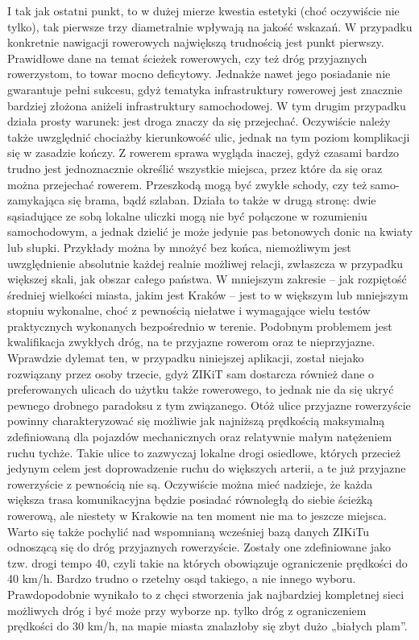 I tak jak ostatni punkt, to w dużej mierze kwestia estetyki (choć oczywiście nie tylko), tak pierwsze trzy diametralnie wpływają na jakość wskazań. W przypadku konkretnie nawigacji rowerowych największą trudnością jest punkt pierwszy. Prawidłowe dane na temat ścieżek rowerowych, czy też dróg przyjaznych rowerzystom, to towar mocno deficytowy. Jednakże nawet jego posiadanie nie gwarantuje pełni sukcesu, gdyż tematyka infrastruktury rowerowej jest znacznie bardziej złożona aniżeli infrastruktury samochodowej. W tym drugim przypadku działa prosty warunek: jest droga znaczy da się przejechać. Oczywiście należy także uwzględnić chociażby kierunkowość ulic, jednak na tym poziom komplikacji się w zasadzie kończy. Z rowerem sprawa wygląda inaczej, gdyż czasami bardzo trudno jest jednoznacznie określić wszystkie miejsca, przez które da się oraz można przejechać rowerem. Przeszkodą mogą być zwykłe schody, czy też samo-zamykająca się brama, bądź szlaban. Działa to także w drugą stronę: dwie sąsiadujące ze sobą lokalne uliczki mogą nie być połączone w rozumieniu samochodowym, a jednak dzielić je może jedynie pas betonowych donic na kwiaty lub słupki. Przykłady można by mnożyć bez końca, niemożliwym jest uwzględnienie absolutnie każdej realnie możliwej relacji, zwłaszcza w przypadku większej skali, jak obszar całego państwa. W mniejszym zakresie – jak rozpiętość średniej wielkości miasta, jakim jest Kraków – jest to w większym lub mniejszym stopniu wykonalne, choć z pewnością niełatwe i wymagające wielu testów praktycznych wykonanych bezpośrednio w terenie. Podobnym problemem jest kwalifikacja zwykłych dróg, na te przyjazne rowerom oraz te nieprzyjazne. Wprawdzie dylemat ten, w przypadku niniejszej aplikacji, został niejako rozwiązany przez osoby trzecie, gdyż ZIKiT sam dostarcza również dane o preferowanych ulicach do użytku także rowerowego, to jednak nie da się ukryć pewnego drobnego paradoksu z tym związanego. Otóż ulice przyjazne rowerzyście powinny charakteryzować się możliwie jak najniższą prędkością maksymalną zdefiniowaną dla pojazdów mechanicznych oraz relatywnie małym natężeniem ruchu tychże. Takie ulice to zazwyczaj lokalne drogi osiedlowe, których przecież jedynym celem jest doprowadzenie ruchu do większych arterii, a te już przyjazne rowerzyście z pewnością nie są. Oczywiście można mieć nadzieje, że każda większa trasa komunikacyjna będzie posiadać równoległą do siebie ścieżką rowerową, ale niestety w Krakowie na ten moment nie ma to jeszcze miejsca.\newline
Warto się także pochylić nad wspomnianą wcześniej bazą danych ZIKiTu odnoszącą się do dróg przyjaznych rowerzyście. Zostały one zdefiniowane jako tzw. drogi tempo 40, czyli takie na których obowiązuje ograniczenie prędkości do 40 km/h. Bardzo trudno o rzetelny osąd takiego, a nie innego wyboru. Prawdopodobnie wynikało to z chęci stworzenia jak najbardziej kompletnej sieci możliwych dróg i być może przy wyborze np. tylko dróg z ograniczeniem prędkości do 30 km/h, na mapie miasta znalazłoby się zbyt dużo „białych plam”.\newline
